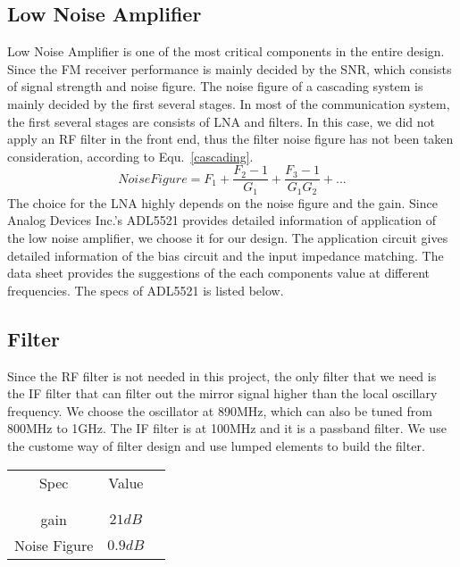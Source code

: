 \documentclass[]{article}
\begin{document}
    \subsection{Low Noise Amplifier}
        Low Noise Amplifier is one of the most critical components in the entire
        design. Since the FM receiver performance is mainly decided by the SNR,
        which consists of signal strength and noise figure. The noise figure of
        a cascading system is mainly decided by the first several stages. In
        most of the communication system, the first several stages are consists
        of LNA and filters. In this case, we did not apply an RF filter in the
        front end, thus the filter noise figure has not been taken
        consideration, according to Equ.~\ref{cascading}.
        \begin{equation}
            Noise Figure = F_{1} + \frac{F_{2} - 1}{G_{1}} + \frac{F_{3} -
            1}{G_{1}G_{2}} + ...
            \label{cascading}
        \end{equation}
        The choice for the LNA highly depends on the noise figure and the gain.
        Since Analog Devices Inc.'s ADL5521 provides detailed information of
        application of the low noise amplifier, we choose it for our design. The
        application circuit gives detailed information of the bias circuit and
        the input impedance matching. The data sheet provides the suggestions of
        the each components value at different frequencies. The specs of ADL5521
        is listed below.

    \subsection{Filter}
        Since the RF filter is not needed in this project, the only filter that
        we need is the IF filter that can filter out the mirror signal higher
        than the local oscillary frequency. We choose the oscillator at 890MHz,
        which can also be tuned from 800MHz to 1GHz. The IF filter is at 100MHz
        and it is a passband filter. We use the custome way of filter design and
        use lumped elements to build the filter.

        \begin{center}
            \begin{tabular}{c c c}
                Spec & Value \\ \\ \hline \\
                gain & $21dB$ \\
                Noise Figure & $0.9dB$ \\
            \end{tabular}
        \end{center}
\end{document}
